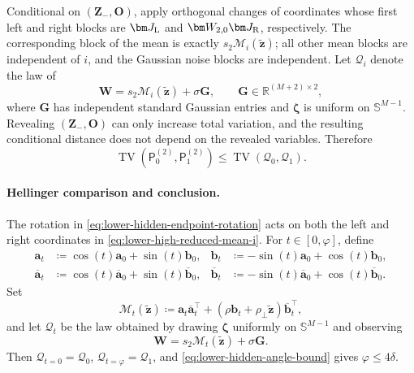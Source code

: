 \documentclass[11pt]{article}
\newcommand{\trans}{\top}
\begin{document}
Conditional on $(\bm Z_-,\bm O)$, apply orthogonal changes of coordinates
whose first left and right blocks are $\bm J_{\rm L}$ and
$\bm W_{2,0}\bm J_{\rm R}$, respectively.  The corresponding block of the
mean is exactly $s_2\bm{\mathcal M}_i(\widetilde{\bm z})$; all other mean
blocks are independent of $i$, and the Gaussian noise blocks are independent.
Let $\mathcal Q_i$ denote the law of
\begin{equation}
  \bm W
  =
  s_2\bm{\mathcal M}_i(\widetilde{\bm z})+\sigma\bm G,
  \qquad
  \bm G\in\mathbb R^{(M+2)\times2},
\label{eq:lower-high-reduced-observation-i}
\end{equation}
where $\bm G$ has independent standard Gaussian entries and
$\bm\zeta$ is uniform on $\mathbb S^{M-1}$.  Revealing
$(\bm Z_-,\bm O)$ can only increase total variation, and the resulting
conditional distance does not depend on the revealed variables.  Therefore
\begin{equation}
  \operatorname{TV}(\mathsf P_0^{(2)},\mathsf P_1^{(2)})
  \le
  \operatorname{TV}(\mathcal Q_0,\mathcal Q_1).
\label{eq:lower-high-tv-reduction}
\end{equation}

\paragraph{Hellinger comparison and conclusion.}
The rotation in \cref{eq:lower-hidden-endpoint-rotation} acts on both the
left and right coordinates in \cref{eq:lower-high-reduced-mean-i}.  For
$t\in[0,\varphi]$, define
\begin{equation}
\begin{aligned}
  \bm a_t&\coloneqq\cos(t)\bm a_0+\sin(t)\bm b_0,
  &
  \bm b_t&\coloneqq-\sin(t)\bm a_0+\cos(t)\bm b_0,\\
  \overline{\bm a}_t
  &\coloneqq
  \cos(t)\overline{\bm a}_0+\sin(t)\overline{\bm b}_0,
  &
  \overline{\bm b}_t
  &\coloneqq
  -\sin(t)\overline{\bm a}_0+\cos(t)\overline{\bm b}_0.
\end{aligned}
\label{eq:lower-high-path-coordinates}
\end{equation}
Set
\begin{equation}
  \bm{\mathcal M}_t(\widetilde{\bm z})
  \coloneqq
  \bm a_t\overline{\bm a}_t^\trans
  +
  (\rho\bm b_t+\rho_\perp\widetilde{\bm z})
  \overline{\bm b}_t^\trans,
\label{eq:lower-high-reduced-mean}
\end{equation}
and let $\mathcal Q_t$ be the law obtained by drawing $\bm\zeta$ uniformly
on $\mathbb S^{M-1}$ and observing
\begin{equation}
  \bm W
  =
  s_2\bm{\mathcal M}_t(\widetilde{\bm z})+\sigma\bm G.
\label{eq:lower-high-path-law}
\end{equation}
Then $\mathcal Q_{t=0}=\mathcal Q_0$,
$\mathcal Q_{t=\varphi}=\mathcal Q_1$, and
\cref{eq:lower-hidden-angle-bound} gives $\varphi\le4\delta$.
\end{document}

